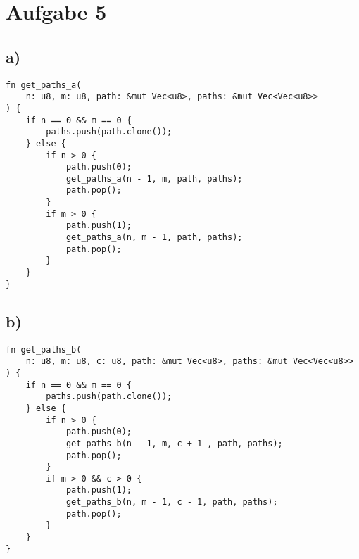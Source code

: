 \documentclass[a4paper]{scrartcl}
\begin{document}
\section*{Aufgabe 5}
\subsection*{a)}
\begin{lstlisting}
fn get_paths_a(
    n: u8, m: u8, path: &mut Vec<u8>, paths: &mut Vec<Vec<u8>>
) {
    if n == 0 && m == 0 {
        paths.push(path.clone());
    } else {
        if n > 0 {
            path.push(0);
            get_paths_a(n - 1, m, path, paths);
            path.pop();
        }
        if m > 0 {
            path.push(1);
            get_paths_a(n, m - 1, path, paths);
            path.pop();
        }
    }
}
\end{lstlisting}

\subsection*{b)}
\begin{lstlisting}
fn get_paths_b(
    n: u8, m: u8, c: u8, path: &mut Vec<u8>, paths: &mut Vec<Vec<u8>>
) {
    if n == 0 && m == 0 {
        paths.push(path.clone());
    } else {
        if n > 0 {
            path.push(0);
            get_paths_b(n - 1, m, c + 1 , path, paths);
            path.pop();
        }
        if m > 0 && c > 0 {
            path.push(1);
            get_paths_b(n, m - 1, c - 1, path, paths);
            path.pop();
        }
    }
}
\end{lstlisting}    
\end{document}
